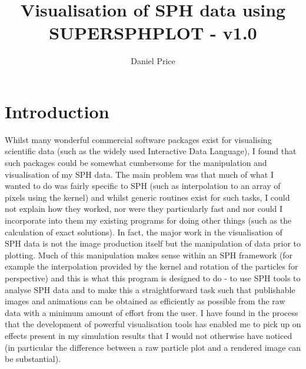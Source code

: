 \documentclass[a4paper,12pt]{article}
\title{Visualisation of SPH data using SUPERSPHPLOT - v1.0}
\author{Daniel Price}
\begin{document}
\maketitle
\tableofcontents

\newpage
\section{Introduction}
 Whilst many wonderful commercial software packages exist for visualising scientific
data (such as the widely used Interactive Data Language), I found that such packages
could be somewhat cumbersome for the manipulation and visualisation of my SPH data. The
main problem was that much of what I wanted to do was fairly specific to SPH (such as
interpolation to an array of pixels using the kernel) and whilst generic routines exist
for such tasks, I could not explain how they worked, nor were they
particularly fast and nor could I incorporate into them my existing programs for doing
other things (such as the calculation of exact solutions). In fact, the major
work in the visualisation of SPH data is not the image production itself but the
manipulation of data prior to plotting. Much of this manipulation makes sense
within an SPH framework (for example the interpolation provided by the kernel
and rotation of the particles for perspective) and this is what this program is
designed to do - to use SPH tools to analyse SPH data and to make this a
straightforward task such that publishable images and animations can be obtained
as efficiently as possible from the raw data with a minimum amount of effort
from the user. I have found in the process that the development of powerful
visualisation tools has enabled me to pick up on effects present in my
simulation results that I would not otherwise have noticed (in particular the
difference between a raw particle plot and a rendered image can be substantial).
\end{document}
